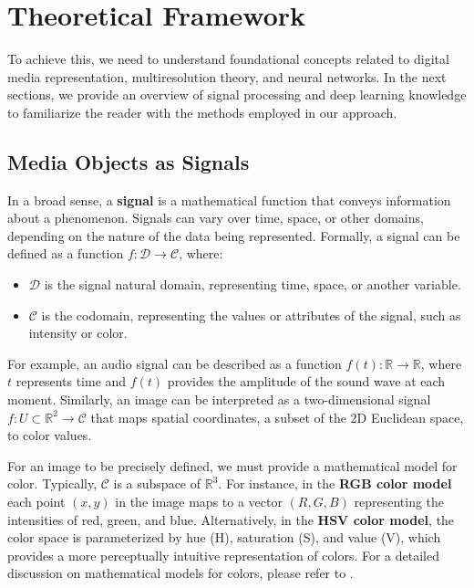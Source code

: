 \chapter{Theoretical Framework}

To achieve this, we need to understand foundational concepts related to digital media representation, multiresolution theory, and neural networks. In the next sections, we provide an overview of signal processing and deep learning knowledge to familiarize the reader  with the methods employed in our approach.


\section{Media Objects as Signals}

In a broad sense, a \textbf{signal} is a mathematical function that conveys information about a phenomenon. Signals can vary over time, space, or other domains, depending on the nature of the data being represented. Formally, a signal can be defined as a function \( f: \mathcal{D} \to \mathcal{C} \), where:

\begin{itemize}
  \item \( \mathcal{D} \) is the signal natural domain, representing time, space, or another variable.
  \item \( \mathcal{C} \) is the codomain, representing the values or attributes of the signal, such as intensity or color.
\end{itemize}

For example, an audio signal can be described as a function \( f(t): \mathbb{R} \to \mathbb{R} \), where \( t \) represents time and \( f(t) \) provides the amplitude of the sound wave at each moment. Similarly, an image can be interpreted as a two-dimensional signal \( f: U \subset \mathbb{R}^2 \to \mathcal{C} \) that maps spatial coordinates, a subset of the 2D Euclidean space, to color values. 

For an image to be precisely defined, we must provide a mathematical model for color. Typically, $\mathcal{C}$ is a subspace of $\mathbb{R}^3$. For instance, in the \textbf{RGB color model} each point \( (x, y) \) in the image maps to a vector \( (R, G, B) \) representing the intensities of red, green, and blue. Alternatively, in the \textbf{HSV color model}, the color space is parameterized by hue (H), saturation (S), and value (V), which provides a more perceptually intuitive representation of colors. For a detailed discussion on mathematical models for colors, please refer to \cite{ipcgVelho2014}.

